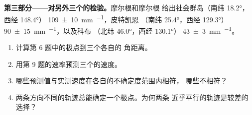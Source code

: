 \begin{problem}
\medskip
\noindent\textbf{第三部分——对另外三个的检验。}摩尔根和摩尔根
给出社会群岛（南纬 \ang{18.2}，西经 \ang{148.4}）
\qty[uncertainty-mode=separate]{109 \pm 10}{mm.^{-1}}，皮特凯恩
（南纬 \ang{25.4}，西经 \ang{129.3}）
\qty[uncertainty-mode=separate]{90 \pm 15}{mm.^{-1}}，以及科布
（北纬 \ang{46.0}，西经 \ang{130.1}）
\qty[uncertainty-mode=separate]{43 \pm 3}{mm.^{-1}}。
\begin{enumerate}[resume]
  \item 计算第 6 题中的极点到三个各自的
        角距离。
  \item 用第 9 题的速率预测三个的速度。
  \item 哪些预测值与实测速度在各自的不确定度范围内相符，
        哪些不相符？
  \item 两条方向不同的轨迹总能确定一个极点。为何两条
        近乎平行的轨迹是较差的选择？
\end{enumerate}


\end{problem}
